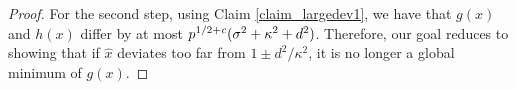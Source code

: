 \begin{proof}



For the second step, using Claim \ref{claim_largedev1}, we have that $g(x)$ and $h(x)$ differ by at most $p^{1/2 + {\mathit{c}}}(\sigma^2 + \kappa^2 + d^2)$.
Therefore, our goal reduces to showing that if $\hat{x}$ deviates too far from $1 \pm d^2 / \kappa^2$, it is no longer a global minimum of $g(x)$.

\end{proof}
